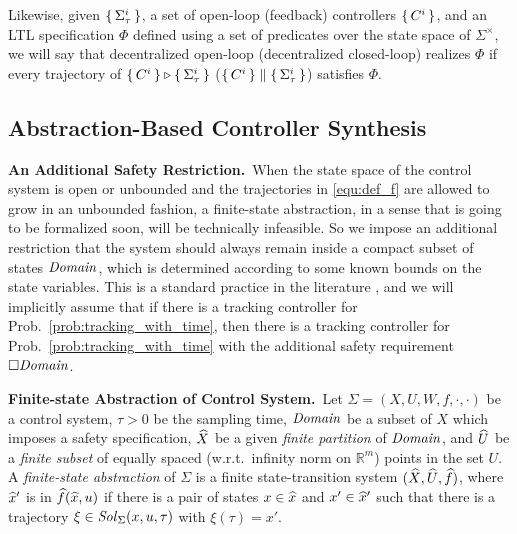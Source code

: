 Likewise, given $\set{\Sigma_\tau^i} $, a set of open-loop (feedback) controllers $\set{C^i} $, and an LTL specification $\Phi$ defined using a set of predicates over the state space of $\Sigma^\times$, we will say that decentralized open-loop (decentralized closed-loop) realizes $\Phi$ if every trajectory of $\set{C^i}\triangleright \set{\Sigma_\tau^i}$ ($\set{C^i}\parallel \set{\Sigma_\tau^i}$) satisfies $\Phi$.

\subsection{Abstraction-Based Controller Synthesis}

\smallskip
\noindent\textbf{An Additional Safety Restriction.}\
When the state space of the control system is open or unbounded and the trajectories in \eqref{equ:def_f} are allowed to grow in an unbounded fashion, a finite-state abstraction, in a sense that is going to be formalized soon, will be technically infeasible.
So we impose an additional restriction that the system should always remain inside a compact subset of states $\mathit{Domain}$, which is determined according to some known bounds on the state variables.
This is a standard practice in the literature \cite{reissig2016feedback}, and we will implicitly assume that if there is a tracking controller for Prob.~\ref{prob:tracking_with_time}, then there is a tracking controller for Prob.~\ref{prob:tracking_with_time} with the additional safety requirement $\square \mathit{Domain}$.
%

\smallskip
\noindent\textbf{Finite-state Abstraction of Control System.}\
Let $\Sigma = (X, U, W, f, \cdot, \cdot)$ be a control system, $\tau>0$ be the sampling time, $\mathit{Domain}$ be a subset of $X$ which imposes a safety specification, $\widehat{X}$ be a given \emph{finite partition} of $\mathit{Domain}$, and $\widehat{U}$ be a \emph{finite subset} of equally spaced (w.r.t.\ infinity norm on $\mathbb{R}^m$) points in the set $U$.
A \emph{finite-state abstraction} of $\Sigma$ is a finite state-transition system $(\widehat{X},\widehat{U},\widehat{f})$, where $\widehat{x}'$ is in $\widehat{f}(\widehat{x},u)$ if there is a pair of states $x\in \widehat{x}$ and $x'\in \widehat{x}'$ such that there is a trajectory $\xi\in \mathit{Sol}_\Sigma(x,u,\tau)$ with $\xi(\tau)=x'$.

